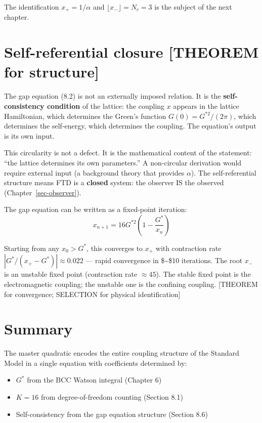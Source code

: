 \documentclass[
  11pt,
  letterpaper,
  twoside,
  openany]{book}
\makeatletter
\providecommand{\tightlist}{%
  \setlength{\itemsep}{0pt}\setlength{\parskip}{0pt}}
\let\orig@section\section
\renewcommand{\section}{\needspace{8\baselineskip}\orig@section}
\newcommand{\Gs}{G^{*}{}}
\newcommand{\Gssq}{G^{*2}{}}      %
\makeatother
\begin{document}
The identification \(x_+ = 1/\alpha\) and
\(\lfloor x_- \rfloor = N_c = 3\) is the subject of the next chapter.

\section{Self-referential closure {[}THEOREM for
structure{]}}\label{self-referential-closure-theorem-for-structure}

The gap equation (8.2) is not an externally imposed relation. It is the
\textbf{self-consistency condition} of the lattice: the coupling \(x\)
appears in the lattice Hamiltonian, which determines the Green's
function \(G(0) = \Gssq/(2\pi)\), which determines the self-energy,
which determines the coupling. The equation's output is its own input.

This circularity is not a defect. It is the mathematical content of the
statement: ``the lattice determines its own parameters.'' A non-circular
derivation would require external input (a background theory that
provides \(\alpha\)). The self-referential structure means FTD is a
\textbf{closed} system: the observer IS the observed
(Chapter~\ref{sec-observer}).

The gap equation can be written as a fixed-point iteration: \[
x_{n+1} = 16\Gssq\left(1 - \frac{\Gs}{x_n}\right)
\tag{8.7}
\]

Starting from any \(x_0 > \Gs\), this converges to \(x_+\) with
contraction rate \(|\Gs/(x_+ - \Gs)| \approx 0.022\) --- rapid
convergence in \$\sim\$10 iterations. The root \(x_-\) is an unstable
fixed point (contraction rate \(\approx 45\)). The stable fixed point is
the electromagnetic coupling; the unstable one is the confining
coupling. {[}THEOREM for convergence; SELECTION for physical
identification{]}

\section{Summary}\label{summary-1}

The master quadratic encodes the entire coupling structure of the
Standard Model in a single equation with coefficients determined by:

\begin{itemize}
\tightlist
\item
  \(\Gs\) from the BCC Watson integral (Chapter 6)
\item
  \(K = 16\) from degree-of-freedom counting (Section 8.1)
\item
  Self-consistency from the gap equation structure (Section 8.6)
\end{itemize}
\end{document}
